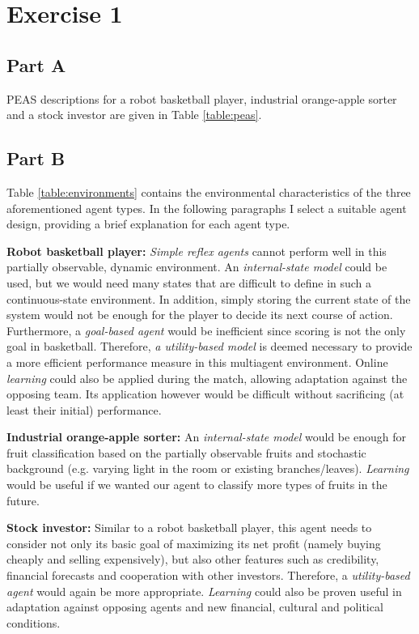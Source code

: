\section*{Exercise 1}

\subsection*{Part A}

PEAS descriptions for a robot basketball player, industrial orange-apple sorter and a stock investor are given in Table \ref{table:peas}.




\subsection*{Part B}

Table \ref{table:environments} contains the environmental characteristics of the three aforementioned agent types. In the following paragraphs I select a suitable agent design, providing a brief explanation for each agent type.




\textbf{Robot basketball player:} \textit{Simple reflex agents} cannot perform well in this partially observable, dynamic environment. An \textit{internal-state model} could be used, but we would need many states that are difficult to define in such a continuous-state environment. In addition, simply storing the current state of the system would not be enough for the player to decide its next course of action. Furthermore, a \textit{goal-based agent} would be inefficient since scoring is not the only goal in basketball. Therefore, \textit{a utility-based model} is deemed necessary to provide a more efficient performance measure in this multiagent environment. Online \textit{learning} could also be applied during the match, allowing adaptation against the opposing team. Its application however would be difficult without sacrificing (at least their initial) performance.

\textbf{Industrial orange-apple sorter:} An \textit{internal-state model} would be enough for fruit classification based on the partially observable fruits and stochastic background (e.g. varying light in the room or existing branches/leaves). \textit{Learning} would be useful if we wanted our agent to classify more types of fruits in the future.

\textbf{Stock investor:} Similar to a robot basketball player, this agent needs to consider not only its basic goal of maximizing its net profit (namely buying cheaply and selling expensively), but also other features such as credibility, financial forecasts and cooperation with other investors. Therefore, a \textit{utility-based agent} would again be more appropriate. \textit{Learning} could also be proven useful in adaptation against opposing agents and new financial, cultural and political conditions.



